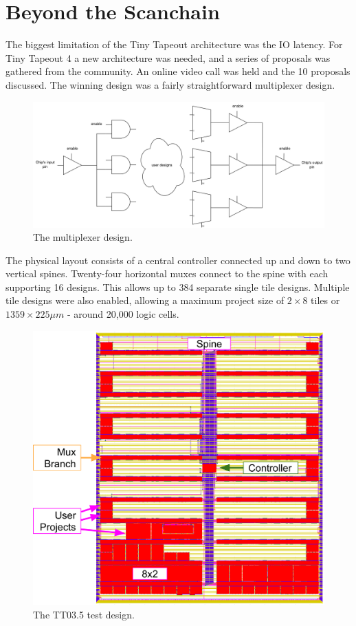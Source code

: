 \section{Beyond the Scanchain}
\label{sec:beyond_scanchain}
The biggest limitation of the Tiny Tapeout architecture was the IO latency.
For Tiny Tapeout 4 a new architecture was needed, and a series of proposals was gathered from the community.
An online video call was held and the 10 proposals discussed.
The winning design was a fairly straightforward multiplexer design.

\begin{figure}[htp]
\centering
\includegraphics[width=\columnwidth]{./Figs/mux architecture.png}
\caption{The multiplexer design.}
\label{fig:multiplexer_design}
\end{figure}

The physical layout consists of a central controller connected up and down to two vertical spines.
Twenty-four horizontal muxes connect to the spine with each supporting 16 designs.
This allows up to 384 separate single tile designs.
Multiple tile designs were also enabled, allowing a maximum project size of \(2 \times 8\) tiles or \(1359 \times 225 \mu m\) - around 20,000 logic cells.

\begin{figure}[htp]
\centering
\includegraphics[width=\columnwidth]{./Figs/tt3p5 layout.png}
\caption{The TT03.5 test design.}
\label{fig:TT03_5_test_design}
\end{figure}


